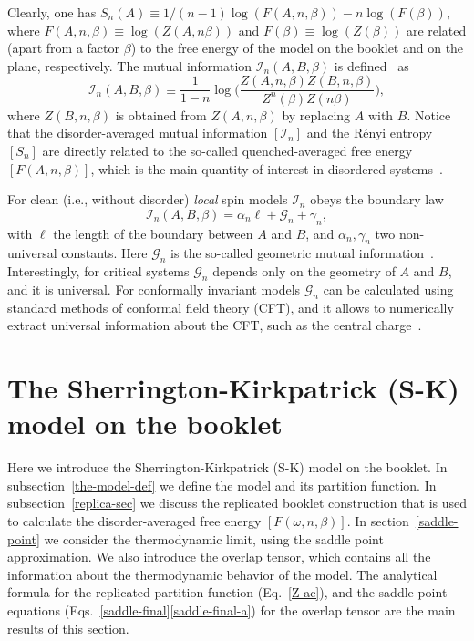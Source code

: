 \documentclass[twocolumn,superscriptaddress,prb,10pt]{revtex4-1}
\begin{document}
Clearly, one has $S_n(A)\equiv1/(n-1)\log(F(A,n,\beta))-n\log(F(\beta))$, where $F(A,n,\beta)
\equiv\log(Z(A,n\beta))$ and $F(\beta)\equiv\log(Z(\beta))$ are related (apart from a factor 
$\beta$) to the free energy of the model on the booklet and on the plane, respectively.
The mutual information ${\mathcal I}_n(A,B,\beta)$ is defined~\cite{jaconis-2013,stephan-2014} 
as 
%
\begin{equation}
\label{MI}
{\mathcal I}_n(A,B,\beta)\equiv\frac{1}{1-n}\log\Big(
\frac{Z(A,n,\beta)Z(B,n,\beta)}{Z^n(\beta)Z(n\beta)}
\Big),
\end{equation}
%
where $Z(B,n,\beta)$ is obtained from $Z(A,n,\beta)$ by replacing $A$ with $B$. 
Notice that the disorder-averaged mutual information $[{\mathcal I}_n]$ and the R\'enyi 
entropy $[S_n]$ are directly related to the so-called quenched-averaged free energy 
$[F(A,n,\beta)]$, which is the main quantity of interest in disordered systems~\cite{cardy-book}. 

For clean (i.e., without disorder) \emph{local} spin models ${\mathcal I}_n$ 
obeys the boundary law 
%
\begin{equation}
{\mathcal I}_n(A,B,\beta)=\alpha_n\ell+{\mathcal G}_n+\gamma_n,
\label{GMI}
\end{equation}
%
with $\ell$ the length of the boundary between $A$ and $B$, and 
$\alpha_n,\gamma_n$ two non-universal constants. Here ${\mathcal G}_n$ 
is the so-called geometric mutual information~\cite{stephan-2014}. 
Interestingly, for critical systems ${\mathcal G}_n$ depends only on the 
geometry of $A$ and $B$, and it is universal. For conformally invariant models 
${\mathcal G}_n$ can be calculated using standard methods of conformal field 
theory (CFT), and it allows to numerically extract universal information 
about the CFT, such as the central charge~\cite{stephan-2014}.  


\section{The Sherrington-Kirkpatrick (S-K) model on the booklet}
\label{the-model}

Here we introduce the Sherrington-Kirkpatrick (S-K) model on the booklet. 
In subsection~\ref{the-model-def}  we define the 
model and its partition function. In subsection~\ref{replica-sec} 
we discuss the replicated booklet construction that is used to calculate the 
disorder-averaged free energy $[F(\omega,n,\beta)]$. 
In section~\ref{saddle-point} we consider the thermodynamic limit, 
using the saddle point approximation. We also introduce the overlap tensor,  
which contains all the information about the thermodynamic behavior of the 
model. The analytical formula for the replicated partition function (Eq.~\eqref{Z-ac}), 
and the saddle point equations (Eqs.~\eqref{saddle-final}\eqref{saddle-final-a}) 
for the overlap tensor are the main results of this section. 
\end{document}
